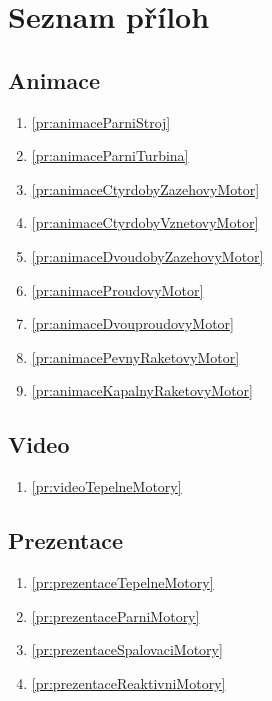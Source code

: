 \section{Seznam příloh}

\subsection*{Animace}
\begin{enumerate}[align=left, labelwidth=0cm, label={Příloha č. -- }\arabic*]
    \item \ref{pr:animaceParniStroj}
    \item \ref{pr:animaceParniTurbina}
    \item \ref{pr:animaceCtyrdobyZazehovyMotor}
    \item \ref{pr:animaceCtyrdobyVznetovyMotor}
    \item \ref{pr:animaceDvoudobyZazehovyMotor}
    \item \ref{pr:animaceProudovyMotor}
    \item \ref{pr:animaceDvouproudovyMotor}
    \item \ref{pr:animacePevnyRaketovyMotor}
    \item \ref{pr:animaceKapalnyRaketovyMotor}
\end{enumerate}

\subsection*{Video}
\begin{enumerate}[align=left, labelwidth=0cm, label={Příloha č. -- }\arabic*, resume]
    \item \ref{pr:videoTepelneMotory}
\end{enumerate}

\subsection*{Prezentace}
\begin{enumerate}[align=left, labelwidth=0cm, label={Příloha č. -- }\arabic*, resume]
    \item \ref{pr:prezentaceTepelneMotory}
    \item \ref{pr:prezentaceParniMotory}
    \item \ref{pr:prezentaceSpalovaciMotory}
    \item \ref{pr:prezentaceReaktivniMotory}
\end{enumerate}


